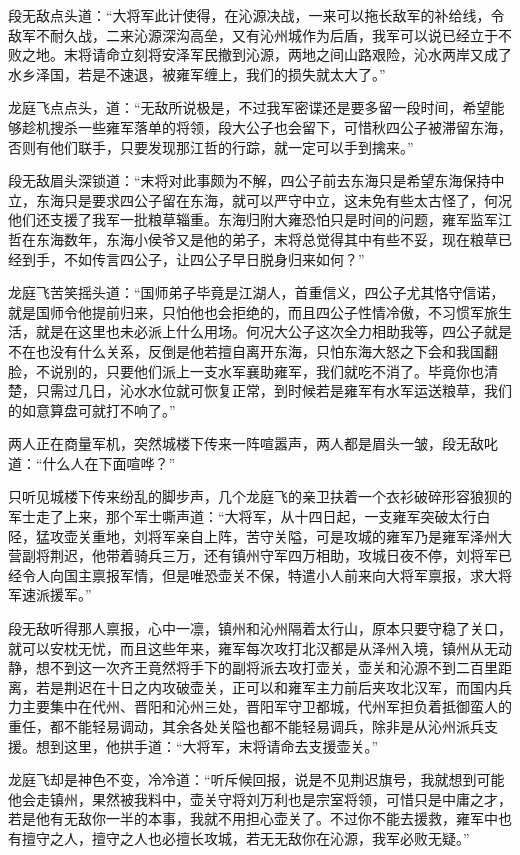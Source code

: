 段无敌点头道：“大将军此计使得，在沁源决战，一来可以拖长敌军的补给线，令敌军不耐久战，二来沁源深沟高垒，又有沁州城作为后盾，我军可以说已经立于不败之地。末将请命立刻将安泽军民撤到沁源，两地之间山路艰险，沁水两岸又成了水乡泽国，若是不速退，被雍军缠上，我们的损失就太大了。”

龙庭飞点点头，道：“无敌所说极是，不过我军密谍还是要多留一段时间，希望能够趁机搜杀一些雍军落单的将领，段大公子也会留下，可惜秋四公子被滞留东海，否则有他们联手，只要发现那江哲的行踪，就一定可以手到擒来。”

段无敌眉头深锁道：“末将对此事颇为不解，四公子前去东海只是希望东海保持中立，东海只是要求四公子留在东海，就可以严守中立，这未免有些太古怪了，何况他们还支援了我军一批粮草辎重。东海归附大雍恐怕只是时间的问题，雍军监军江哲在东海数年，东海小侯爷又是他的弟子，末将总觉得其中有些不妥，现在粮草已经到手，不如传言四公子，让四公子早日脱身归来如何？”

龙庭飞苦笑摇头道：“国师弟子毕竟是江湖人，首重信义，四公子尤其恪守信诺，就是国师令他提前归来，只怕他也会拒绝的，而且四公子性情冷傲，不习惯军旅生活，就是在这里也未必派上什么用场。何况大公子这次全力相助我等，四公子就是不在也没有什么关系，反倒是他若擅自离开东海，只怕东海大怒之下会和我国翻脸，不说别的，只要他们派上一支水军襄助雍军，我们就吃不消了。毕竟你也清楚，只需过几日，沁水水位就可恢复正常，到时候若是雍军有水军运送粮草，我们的如意算盘可就打不响了。”

两人正在商量军机，突然城楼下传来一阵喧嚣声，两人都是眉头一皱，段无敌叱道：“什么人在下面喧哗？”

只听见城楼下传来纷乱的脚步声，几个龙庭飞的亲卫扶着一个衣衫破碎形容狼狈的军士走了上来，那个军士嘶声道：“大将军，从十四日起，一支雍军突破太行白陉，猛攻壶关重地，刘将军亲自上阵，苦守关隘，可是攻城的雍军乃是雍军泽州大营副将荆迟，他带着骑兵三万，还有镇州守军四万相助，攻城日夜不停，刘将军已经令人向国主禀报军情，但是唯恐壶关不保，特遣小人前来向大将军禀报，求大将军速派援军。”

段无敌听得那人禀报，心中一凛，镇州和沁州隔着太行山，原本只要守稳了关口，就可以安枕无忧，而且这些年来，雍军每次攻打北汉都是从泽州入境，镇州从无动静，想不到这一次齐王竟然将手下的副将派去攻打壶关，壶关和沁源不到二百里距离，若是荆迟在十日之内攻破壶关，正可以和雍军主力前后夹攻北汉军，而国内兵力主要集中在代州、晋阳和沁州三处，晋阳军守卫都城，代州军担负着抵御蛮人的重任，都不能轻易调动，其余各处关隘也都不能轻易调兵，除非是从沁州派兵支援。想到这里，他拱手道：“大将军，末将请命去支援壶关。”

龙庭飞却是神色不变，冷冷道：“听斥候回报，说是不见荆迟旗号，我就想到可能他会走镇州，果然被我料中，壶关守将刘万利也是宗室将领，可惜只是中庸之才，若是他有无敌你一半的本事，我就不用担心壶关了。不过你不能去援救，雍军中也有擅守之人，擅守之人也必擅长攻城，若无无敌你在沁源，我军必败无疑。”

